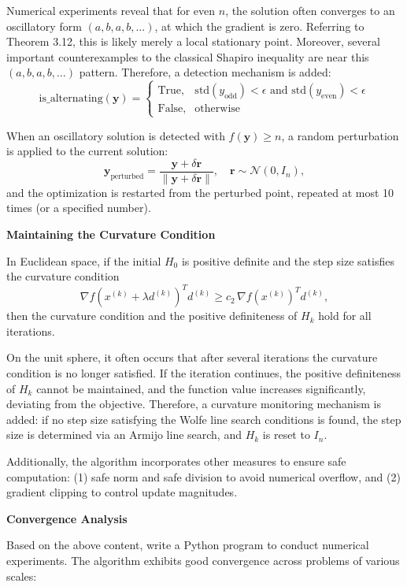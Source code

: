 \documentclass[a4paper,fleqn,numbers]{cas-sc}
\begin{document}
	Numerical experiments reveal that for even $n$, the solution often converges to an oscillatory form $(a,b,a,b,\ldots)$, at which the gradient is zero. Referring to Theorem 3.12, this is likely merely a local stationary point. Moreover, several important counterexamples to the classical Shapiro inequality are near this $(a,b,a,b,\ldots)$ pattern. Therefore, a detection mechanism is added:
	\[
	\text{is\_alternating}(\mathbf{y}) = 
	\begin{cases}
		\text{True}, & \text{std}(y_{\text{odd}}) < \epsilon \text{ and std}(y_{\text{even}}) < \epsilon \\
		\text{False}, & \text{otherwise}
	\end{cases}
	\]
	
	When an oscillatory solution is detected with $f(\mathbf{y}) \geq n$, a random perturbation is applied to the current solution:
	\[
	\mathbf{y}_{\text{perturbed}} = \frac{\mathbf{y} + \delta \mathbf{r}}{\|\mathbf{y} + \delta \mathbf{r}\|}, \quad \mathbf{r} \sim \mathcal{N}(0,I_n),
	\]
	and the optimization is restarted from the perturbed point, repeated at most 10 times (or a specified number).
	
	\textbf{Maintaining the Curvature Condition}
	
	In Euclidean space, %
	if the initial $H_0$ is positive definite and the step size satisfies the curvature condition
	\[
	\nabla f(x^{(k)} + \lambda d^{(k)})^{T} d^{(k)} \geq c_2 \, \nabla f(x^{(k)})^{T} d^{(k)},
	\]
	then the curvature condition and the positive definiteness of $H_k$ hold for all iterations.
	
	On the unit sphere, it often occurs that after several iterations the curvature condition is no longer satisfied. If the iteration continues, the positive definiteness of $H_k$ cannot be maintained, and the function value increases significantly, deviating from the objective. Therefore, a curvature monitoring mechanism is added: if no step size satisfying the Wolfe line search conditions is found, the step size is determined via an Armijo line search, and $H_k$ is reset to $I_n$.
	
	Additionally, the algorithm incorporates other measures to ensure safe computation: (1) safe norm and safe division to avoid numerical overflow, and (2) gradient clipping to control update magnitudes.
	
	\textbf{Convergence Analysis}
	
	Based on the above content, write a Python program \cite{wang2026} to conduct numerical experiments. The algorithm exhibits good convergence across problems of various scales:
	
\end{document}
